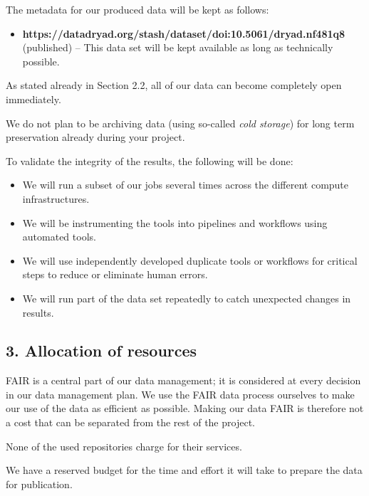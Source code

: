 \documentclass[
  english,
]{article}
\providecommand{\tightlist}{%
  \setlength{\itemsep}{0pt}\setlength{\parskip}{0pt}}
\begin{document}
\hypertarget{q-reusable}{}
The metadata for our produced data will be kept as follows:

\begin{itemize}
\tightlist
\item
  \textbf{https://datadryad.org/stash/dataset/doi:10.5061/dryad.nf481q8}
  (published) {--} This data set will be kept available as long as
  technically possible.
\end{itemize}

As stated already in Section 2.2, all of our data can become completely
open immediately.

We do not plan to be archiving data (using so-called \emph{cold
storage}) for long term preservation already during your project.

To validate the integrity of the results, the following will be done:

\begin{itemize}
\tightlist
\item
  We will run a subset of our jobs several times across the different
  compute infrastructures.
\item
  We will be instrumenting the tools into pipelines and workflows using
  automated tools.
\item
  We will use independently developed duplicate tools or workflows for
  critical steps to reduce or eliminate human errors.
\item
  We will run part of the data set repeatedly to catch unexpected
  changes in results.
\end{itemize}

\hypertarget{sec-resource-allocation}{}
\hypertarget{allocation-of-resources}{%
\subsection{3. Allocation of resources}\label{allocation-of-resources}}

\hypertarget{q-resource-allocation}{}
FAIR is a central part of our data management; it is considered at every
decision in our data management plan. We use the FAIR data process
ourselves to make our use of the data as efficient as possible. Making
our data FAIR is therefore not a cost that can be separated from the
rest of the project.

None of the used repositories charge for their services.

We have a reserved budget for the time and effort it will take to
prepare the data for publication.
\end{document}
